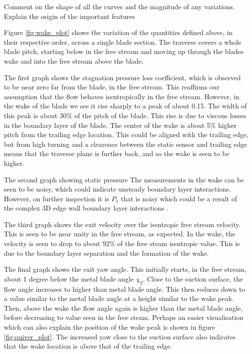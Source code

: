\documentclass{article}
\begin{document}
Comment on the shape of all the curves and the magnitude of any variations. Explain the origin
of the important features

Figure \ref{fig:wake_plot} shows the variation of the quantities defined above, in their respective order, across a single blade section.
The traverse covers a whole blade pitch, starting below in the free stream and moving up through the blades wake and into the free stream above the blade.

The first graph shows the stagnation pressure loss coefficient, which is observed to be near zero far from the blade, in the free stream.
This reaffirms our assumption that the flow behaves isentropically in the free stream.
However, in the wake of the blade we see it rise sharply to a peak of about 0.15.
The width of this peak is about 30\% of the pitch of the blade. This rise is due to viscous losses in the boundary layer of the blade.
The center of the wake is about 5\% higher pitch from the trailing edge location.
This could be aligned with the trailing edge, but from high turning and a clearence between the static sensor and trailing edge means that the traverse plane is further back, and so the wake is seen to be higher.

The second graph showing static pressure 
The measurements in the wake can be seen to be noisy, which could indicate unsteady boundary layer interactions.
However, on further inspection it is $P_1$ that is noisy which could be a result of the complex 3D edge wall boundary layer interactions \cite{losses}.

The third graph shows the exit velocity over the isentropic free stream velocity.
This is seen to be near unity in the free stream, as expected.
In the wake, the velocity is seen to drop to about 92\% of the free steam isentropic value.
This is due to the boundary layer separation and the formation of the wake.

The final graph shows the exit yaw angle.
This initially starts, in the free stream, about 1 degree below the metal blade angle $\chi_2$.
Close to the suction surface, the flow angle increases to higher than metal blade angle.
This then reduces down to a value similar to the metal blade angle at a height similar to the wake peak.
Then, above the wake the flow angle again is higher than the metal blade angle, before decreasing to value seen in the free steam.
Perhaps an easier visualisation which can also explain the position of the wake peak is shown in figure \ref{fig:quiver_plot}.
The increased yaw close to the suction surface also indicates that the wake location is above that of the trailing edge.
\end{document}
